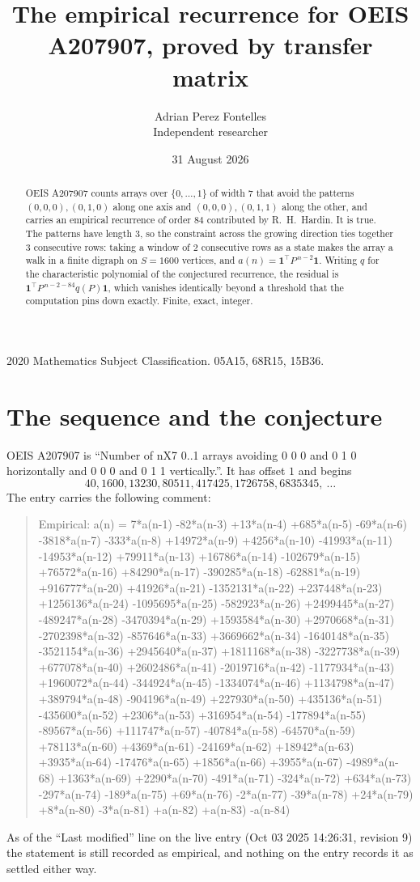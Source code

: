 \documentclass[11pt,a4paper]{article}
\title{The empirical recurrence for OEIS A207907, proved by transfer matrix}
\author{Adrian Perez Fontelles\\ \small Independent researcher}
\date{31 August 2026}
\theoremstyle{plain}
\theoremstyle{definition}
\begin{document}
\maketitle

\begin{abstract}
OEIS A207907 counts arrays over $\{0,\dots,1\}$ of width $7$ that avoid the patterns
$(0,0,0), (0,1,0)$ along one axis and $(0,0,0), (0,1,1)$ along the other, and carries an empirical recurrence of
order $84$ contributed by R.~H.~Hardin. It is true. The patterns have length $3$, so
the constraint across the growing direction ties together $3$ consecutive rows: taking a
window of $2$ consecutive rows as a state makes the array a walk in a finite digraph
on $S=1600$ vertices, and $a(n)=\mathbf{1}^{\!\top}P^{\,n-2}\mathbf{1}$. Writing $q$
for the characteristic polynomial of the conjectured recurrence, the residual is
$\mathbf{1}^{\!\top}P^{\,n-2-84}q(P)\mathbf{1}$, which vanishes identically
beyond a threshold that the computation pins down exactly. Finite, exact, integer.
\end{abstract}

\noindent\small 2020 Mathematics Subject Classification. 05A15, 68R15, 15B36.\normalsize

\section{The sequence and the conjecture}

OEIS A207907 is ``Number of nX7 0..1 arrays avoiding 0 0 0 and 0 1 0 horizontally and 0 0 0 and 0 1 1 vertically.''. It has offset
$1$ and begins
\[
40, 1600, 13230, 80511, 417425, 1726758, 6835345,\ \dots
\]
The entry carries the following comment:
\begin{quote}\small
Empirical: a(n) = 7*a(n-1) -82*a(n-3) +13*a(n-4) +685*a(n-5) -69*a(n-6) -3818*a(n-7) -333*a(n-8) +14972*a(n-9) +4256*a(n-10) -41993*a(n-11) -14953*a(n-12) +79911*a(n-13) +16786*a(n-14) -102679*a(n-15) +76572*a(n-16) +84290*a(n-17) -390285*a(n-18) -62881*a(n-19) +916777*a(n-20) +41926*a(n-21) -1352131*a(n-22) +237448*a(n-23) +1256136*a(n-24) -1095695*a(n-25) -582923*a(n-26) +2499445*a(n-27) -489247*a(n-28) -3470394*a(n-29) +1593584*a(n-30) +2970668*a(n-31) -2702398*a(n-32) -857646*a(n-33) +3669662*a(n-34) -1640148*a(n-35) -3521154*a(n-36) +2945640*a(n-37) +1811168*a(n-38) -3227738*a(n-39) +677078*a(n-40) +2602486*a(n-41) -2019716*a(n-42) -1177934*a(n-43) +1960072*a(n-44) -344924*a(n-45) -1334074*a(n-46) +1134798*a(n-47) +389794*a(n-48) -904196*a(n-49) +227930*a(n-50) +435136*a(n-51) -435600*a(n-52) +2306*a(n-53) +316954*a(n-54) -177894*a(n-55) -89567*a(n-56) +111747*a(n-57) -40784*a(n-58) -64570*a(n-59) +78113*a(n-60) +4369*a(n-61) -24169*a(n-62) +18942*a(n-63) +3935*a(n-64) -17476*a(n-65) +1856*a(n-66) +3955*a(n-67) -4989*a(n-68) +1363*a(n-69) +2290*a(n-70) -491*a(n-71) -324*a(n-72) +634*a(n-73) -297*a(n-74) -189*a(n-75) +69*a(n-76) -2*a(n-77) -39*a(n-78) +24*a(n-79) +8*a(n-80) -3*a(n-81) +a(n-82) +a(n-83) -a(n-84)
\end{quote}
As of the ``Last modified'' line on the live entry (Oct 03 2025 14:26:31, revision
9) the statement is still recorded as empirical, and nothing on the entry
records it as settled either way.
\end{document}
